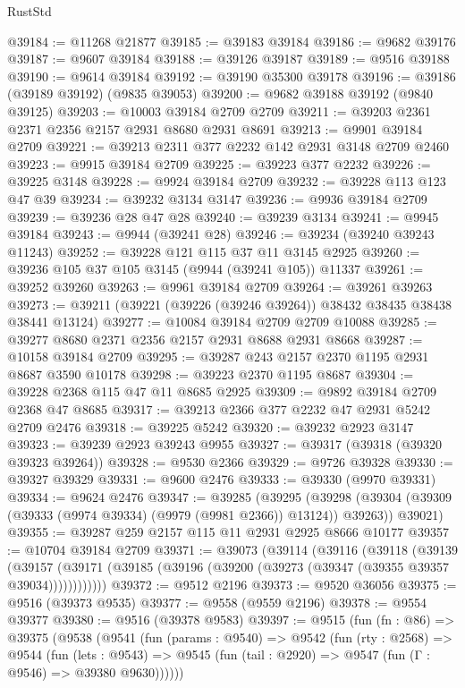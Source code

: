 \begin{lexlean}{RustStd}
\begin{coremodule}
@39184 := @11268 @21877
@39185 := @39183 @39184
@39186 := @9682 @39176
@39187 := @9607 @39184
@39188 := @39126 @39187
@39189 := @9516 @39188
@39190 := @9614 @39184
@39192 := @39190 @35300 @39178
@39196 := @39186 (@39189 @39192) (@9835 @39053)
@39200 := @9682 @39188 @39192 (@9840 @39125)
@39203 := @10003 @39184 @2709 @2709
@39211 := @39203 @2361 @2371 @2356 @2157 @2931 @8680 @2931 @8691
@39213 := @9901 @39184 @2709
@39221 := @39213 @2311 @377 @2232 @142 @2931 @3148 @2709 @2460
@39223 := @9915 @39184 @2709
@39225 := @39223 @377 @2232
@39226 := @39225 @3148
@39228 := @9924 @39184 @2709
@39232 := @39228 @113 @123 @47 @39
@39234 := @39232 @3134 @3147
@39236 := @9936 @39184 @2709
@39239 := @39236 @28 @47 @28
@39240 := @39239 @3134
@39241 := @9945 @39184
@39243 := @9944 (@39241 @28)
@39246 := @39234 (@39240 @39243 @11243)
@39252 := @39228 @121 @115 @37 @11 @3145 @2925
@39260 := @39236 @105 @37 @105 @3145 (@9944 (@39241 @105)) @11337
@39261 := @39252 @39260
@39263 := @9961 @39184 @2709
@39264 := @39261 @39263
@39273 := @39211 (@39221 (@39226 (@39246 @39264)) @38432 @38435 @38438 @38441 @13124)
@39277 := @10084 @39184 @2709 @2709 @10088
@39285 := @39277 @8680 @2371 @2356 @2157 @2931 @8688 @2931 @8668
@39287 := @10158 @39184 @2709
@39295 := @39287 @243 @2157 @2370 @1195 @2931 @8687 @3590 @10178
@39298 := @39223 @2370 @1195 @8687
@39304 := @39228 @2368 @115 @47 @11 @8685 @2925
@39309 := @9892 @39184 @2709 @2368 @47 @8685
@39317 := @39213 @2366 @377 @2232 @47 @2931 @5242 @2709 @2476
@39318 := @39225 @5242
@39320 := @39232 @2923 @3147
@39323 := @39239 @2923 @39243 @9955
@39327 := @39317 (@39318 (@39320 @39323 @39264))
@39328 := @9530 @2366
@39329 := @9726 @39328
@39330 := @39327 @39329
@39331 := @9600 @2476
@39333 := @39330 (@9970 @39331)
@39334 := @9624 @2476
@39347 := @39285
    (@39295
      (@39298 (@39304 (@39309 (@39333 (@9974 @39334) (@9979 (@9981 @2366)) @13124)) @39263))
      @39021)
@39355 := @39287 @259 @2157 @115 @11 @2931 @2925 @8666 @10177
@39357 := @10704 @39184 @2709
@39371 := @39073
    (@39114
      (@39116
        (@39118
          (@39139
            (@39157
              (@39171 (@39185 (@39196 (@39200 (@39273 (@39347 (@39355 @39357 @39034))))))))))))
@39372 := @9512 @2196
@39373 := @9520 @36056
@39375 := @9516 (@39373 @9535)
@39377 := @9558 (@9559 @2196)
@39378 := @9554 @39377
@39380 := @9516 (@39378 @9583)
@39397 := @9515
    (fun (fn : @86) =>
    @39375
      (@9538
        (@9541
          (fun (params : @9540) =>
          @9542
            (fun (rty : @2568) =>
            @9544
              (fun (lets : @9543) =>
              @9545 (fun (tail : @2920) => @9547 (fun (Γ : @9546) => @39380 @9630))))))

\end{coremodule}
\end{lexlean}
